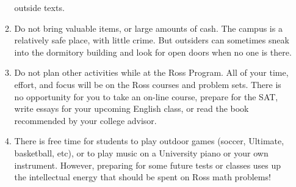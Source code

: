\documentclass[11pt]{ross}
\begin{document}
\begin{enumerate}[label=(\arabic*),itemsep=2em,topsep=-1em]
\begin{enumerate}[label=(\alph*),itemsep=0.5em,topsep=0em]
    outside texts.
  \item Do not bring valuable items, or large amounts of cash.  The
    campus is a relatively safe place, with little crime.  But
    outsiders can sometimes sneak into the dormitory building and look
    for open doors when no one is there.
  \item Do not plan other activities while at the Ross Program. All of 
    your time, effort, and focus will be on the Ross courses and problem 
    sets.  There is no opportunity for you to take an on-line course, 
    prepare  for the SAT, write essays for your upcoming English 
    class, or read the book recommended by your college advisor.
  \item There is free time for students to play outdoor games (soccer, Ultimate, 
    basketball, etc), or to play music on a University piano or your own 
    instrument.   However, preparing for some future tests or classes uses up 
    the intellectual energy that should be spent on Ross math problems!
\end{enumerate}
\end{enumerate}
\end{document}
